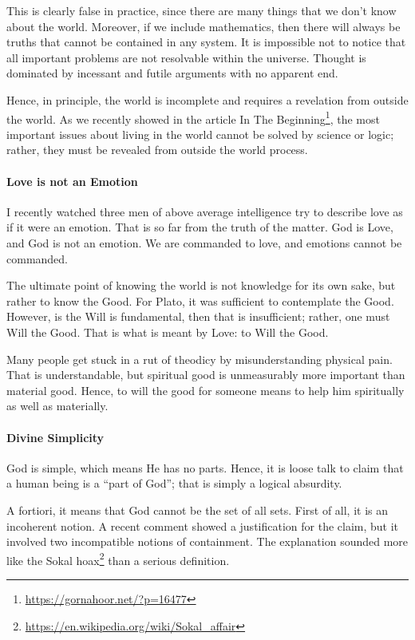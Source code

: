 This is clearly false in practice, since there are many things that we don't know about the world. Moreover, if we include mathematics, then there will always be truths that cannot be contained in any system. It is impossible not to notice that all important problems are not resolvable within the universe. Thought is dominated by incessant and futile arguments with no apparent end.

Hence, in principle, the world is incomplete and requires a revelation from outside the world. As we recently showed in the article In The Beginning\footnote{\url{https://gornahoor.net/?p=16477}}, the most important issues about living in the world cannot be solved by science or logic; rather, they must be revealed from outside the world process.

\paragraph{Love is not an Emotion}


I recently watched three men of above average intelligence try to describe love as if it were an emotion. That is so far from the truth of the matter. God is Love, and God is not an emotion. We are commanded to love, and emotions cannot be commanded.

The ultimate point of knowing the world is not knowledge for its own sake, but rather to know the Good. For Plato, it was sufficient to contemplate the Good. However, is the Will is fundamental, then that is insufficient; rather, one must Will the Good. That is what is meant by Love: to Will the Good.

Many people get stuck in a rut of theodicy by misunderstanding physical pain. That is understandable, but spiritual good is unmeasurably more important than material good. Hence, to will the good for someone means to help him spiritually as well as materially.

\paragraph{Divine Simplicity}


God is simple, which means He has no parts. Hence, it is loose talk to claim that a human being is a ``part of God''; that is simply a logical absurdity.

A fortiori, it means that God cannot be the set of all sets. First of all, it is an incoherent notion. A recent comment showed a justification for the claim, but it involved two incompatible notions of containment. The explanation sounded more like the Sokal hoax\footnote{\url{https://en.wikipedia.org/wiki/Sokal\_affair}} than a serious definition.

